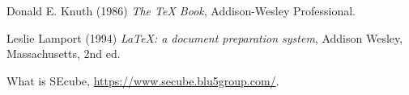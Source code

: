\begin{thebibliography}{9}
Donald E. Knuth (1986) \emph{The \TeX{} Book}, Addison-Wesley Professional.

Leslie Lamport (1994) \emph{\LaTeX: a document preparation system}, Addison
Wesley, Massachusetts, 2nd ed.

What is SEcube, \url{https://www.secube.blu5group.com/}.
    
\end{thebibliography}